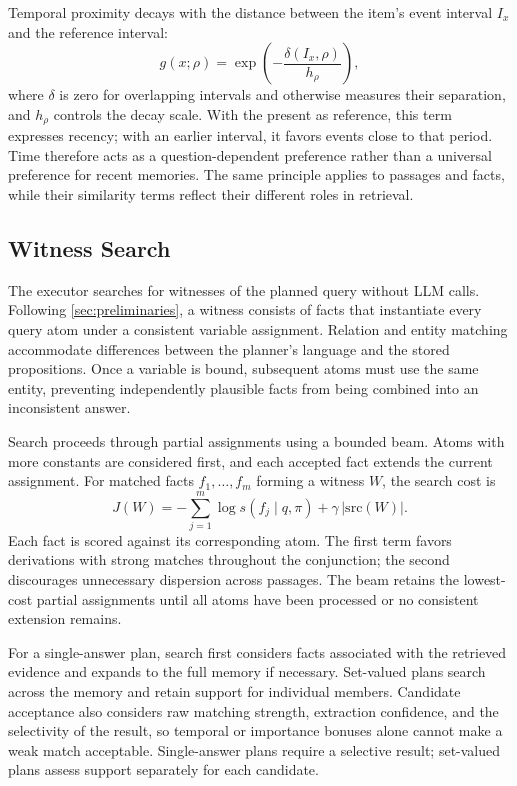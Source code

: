 Temporal proximity decays with the distance between the item's event
interval $I_x$ and the reference interval:
\begin{equation}
 g(x;\rho)=\exp\!\left(-\frac{\delta(I_x,\rho)}{h_\rho}\right),
 \label{eq:proximity}
\end{equation}
where $\delta$ is zero for overlapping intervals and otherwise measures
their separation, and $h_\rho$ controls the decay scale. With the present
as reference, this term expresses recency; with an earlier interval, it
favors events close to that period. Time therefore acts as a
question-dependent preference rather than a universal preference for
recent memories. The same principle applies to passages and facts,
while their similarity terms reflect their different roles in retrieval.

\subsection{Witness Search}
\label{sec:method-prove}

The executor searches for witnesses of the planned query without
\ac{LLM} calls. Following \cref{sec:preliminaries}, a witness consists
of facts that instantiate every query atom under a consistent variable
assignment. Relation and entity matching accommodate differences
between the planner's language and the stored propositions. Once a
variable is bound, subsequent atoms must use the same entity, preventing
independently plausible facts from being combined into an inconsistent
answer.

Search proceeds through partial assignments using a bounded beam.
Atoms with more constants are considered first, and each accepted fact
extends the current assignment. For matched facts $f_1,\ldots,f_m$
forming a witness $W$, the search cost is
\begin{equation}
 J(W)=-\sum_{j=1}^{m}\log s(f_j\mid q,\pi)
       +\gamma\,|\mathrm{src}(W)|.
 \label{eq:witness-search}
\end{equation}
Each fact is scored against its corresponding atom. The first term
favors derivations with strong matches throughout the conjunction;
the second discourages unnecessary dispersion across passages.
The beam retains the lowest-cost partial assignments until all atoms
have been processed or no consistent extension remains.

For a single-answer plan, search first considers facts associated with
the retrieved evidence and expands to the full memory if necessary.
Set-valued plans search across the memory and retain support for
individual members. Candidate acceptance also considers raw matching
strength, extraction confidence, and the selectivity of the result,
so temporal or importance bonuses alone cannot make a weak match
acceptable. Single-answer plans require a selective result; set-valued
plans assess support separately for each candidate.

